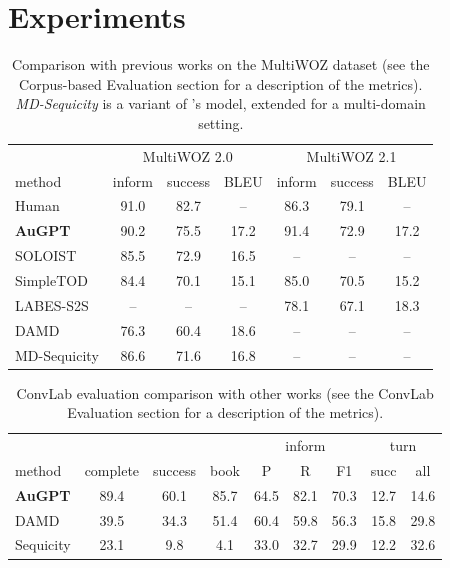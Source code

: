 \documentclass[letterpaper]{article} %
\begin{document}
\section{Experiments}
\begin{table}[htbp]
    \centering
    \begin{tabular}{l|ccc|ccc}
      \toprule
      & \multicolumn{3}{c|}{MultiWOZ 2.0} & \multicolumn{3}{c}{MultiWOZ 2.1} \\
      method & inform & success & BLEU & inform & success & BLEU \\
      \midrule
      Human & 91.0 & 82.7 & -- & 86.3 & 79.1 & -- \\
      \midrule
      \textbf{AuGPT} & 90.2 & 75.5 & 17.2 & 91.4 & 72.9 & 17.2 \\
      SOLOIST \cite{peng2020} & 85.5 & 72.9 & 16.5 & -- & -- & -- \\
      SimpleTOD \cite{hosseini2020} & 84.4 & 70.1 & 15.1 & 85.0 & 70.5 & 15.2 \\
      LABES-S2S \cite{zhang2020end2end} & -- & -- & -- & 78.1 & 67.1 & 18.3 \\
      DAMD \cite{zhang2019} & 76.3 & 60.4 & 18.6 & -- & -- & -- \\
      MD-Sequicity \cite{zhang2019} & 86.6 & 71.6 & 16.8 & -- & -- & -- \\
      \bottomrule
  \end{tabular}
  \caption{Comparison with previous works on the MultiWOZ dataset (see the Corpus-based Evaluation section for a description of the metrics). \emph{MD-Sequicity} is a variant of \citet{lei2018}'s model, extended for a multi-domain setting.}
  \label{tab:multiwoz_sota_comparison}
\end{table}
\begin{table}[htbp]
    \centering
    \begin{tabular}{l|ccc|ccc|cc}
      \toprule
       &  & & & \multicolumn{3}{c|}{inform} & \multicolumn{2}{c}{turn} \\
      method & complete & success & book & P & R & F1 & succ & all \\
      \midrule
      \textbf{AuGPT} & 89.4 & 60.1 & 85.7 & 64.5 & 82.1 & 70.3 & 12.7 & 14.6 \\
      DAMD \cite{zhang2019} & 39.5 & 34.3 & 51.4 & 60.4 & 59.8 & 56.3 & 15.8 & 29.8\\
      Sequicity \cite{lei2018} & 23.1 & \phantom{0}9.8 & \phantom{0}4.1 & 33.0 & 32.7 & 29.9 & 12.2 & 32.6 \\
      \bottomrule
  \end{tabular}
  \caption{ConvLab evaluation comparison with other works (see the ConvLab Evaluation section for a description of the metrics).}
  \label{tab:multiwoz_convlab_comparison}
\end{table}
\end{document}
